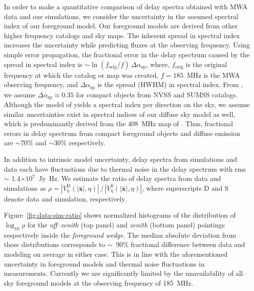 \documentclass[preprint2,iop,numberedappendix]{emulateapj}
\begin{document}
In order to make a quantitative comparison of delay spectra obtained with MWA data and our simulations, we consider the uncertainty in the assumed spectral index of our foreground model. Our foreground models are derived from other higher frequency catalogs and sky maps. The inherent spread in spectral index increases the uncertainty while predicting fluxes at the observing frequency. Using simple error propagation, the fractional error in the delay spectrum caused by the spread in spectral index is $\sim \ln(f_\textrm{orig}/f)\,\Delta\alpha_\textrm{sp}$, where, $f_\textrm{orig}$ is the original frequency at which the catalog or map was created, $f=185$~MHz is the MWA observing frequency, and $\Delta\alpha_\textrm{sp}$ is the spread (HWHM) in spectral index. From \citet{mau03}, we assume $\Delta\alpha_\textrm{sp} \approx 0.35$ for compact objects from NVSS and SUMSS catalogs. Although the model of \citet{deo08} yields a spectral index per direction on the sky, we assume similar uncertainties exist in spectral indices of our diffuse sky model as well, which is predominantly derived from the 408~MHz map of \citet{has82}. Thus, fractional errors in delay spectrum from compact foreground objects and diffuse emission are $\sim$70\% and $\sim$30\% respectively. 

In addition to intrinsic model uncertainty, delay spectra from simulations and data each have fluctuations due to thermal noise in the delay spectrum with rms $\sim$ 1.4$\times 10^7$~Jy~Hz. We estimate the ratio of delay spectra from data and simulations as $\rho = |V^\textrm{D}_\eta(|\overline{\mathbf{x}}|,\eta)|\,/\,|V^\textrm{S}_\eta(|\overline{\mathbf{x}}|,\eta)|$, where superscripts D and S denote data and simulation, respectively. %

Figure~\ref{fig:data-sim-ratio} shows normalized histograms of the distribution of $\log_{10}\rho$ for the {\it off--zenith} (top panel) and {\it zenith} (bottom panel) pointings respectively inside the {\it foreground wedge}. The median absolute deviation from these distributions corresponds to $\sim$~90\% fractional difference between data and modeling on average in either case. This is in line with the aforementioned uncertainty in foreground models and thermal noise fluctuations in measurements. Currently we are significantly limited by the unavailability of all--sky foreground models at the observing frequency of 185~MHz. 
\end{document}
